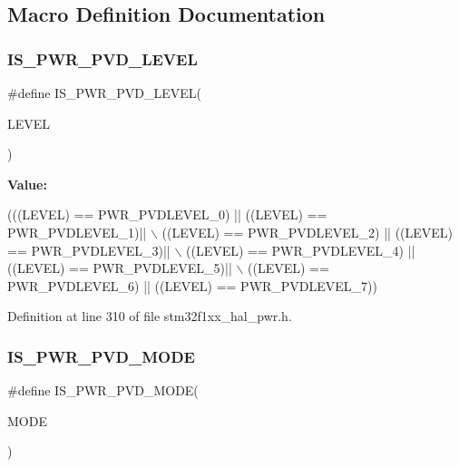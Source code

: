 \subsection{Macro Definition Documentation}
\mbox{\label{group___p_w_r___private___macros_gabac4485a57abc97aad91eaa0b65ae927}} 
\subsubsection{\texorpdfstring{I\+S\+\_\+\+P\+W\+R\+\_\+\+P\+V\+D\+\_\+\+L\+E\+V\+EL}{IS\_PWR\_PVD\_LEVEL}}
{\footnotesize\ttfamily \#define I\+S\+\_\+\+P\+W\+R\+\_\+\+P\+V\+D\+\_\+\+L\+E\+V\+EL(\begin{DoxyParamCaption}\item[{}]{L\+E\+V\+EL }\end{DoxyParamCaption})}

{\bfseries Value\+:}
\begin{DoxyCode}
(((LEVEL) == PWR\_PVDLEVEL\_0) || ((LEVEL) == PWR\_PVDLEVEL\_1)|| \(\backslash\)
                                 ((LEVEL) == PWR\_PVDLEVEL\_2) || ((LEVEL) == PWR\_PVDLEVEL\_3)|| \(\backslash\)
                                 ((LEVEL) == PWR\_PVDLEVEL\_4) || ((LEVEL) == PWR\_PVDLEVEL\_5)|| \(\backslash\)
                                 ((LEVEL) == PWR\_PVDLEVEL\_6) || ((LEVEL) == PWR\_PVDLEVEL\_7))
\end{DoxyCode}


Definition at line 310 of file stm32f1xx\+\_\+hal\+\_\+pwr.\+h.

\mbox{\label{group___p_w_r___private___macros_ga8edfbbba20e58a9281408c23dc6ff7ef}} 
\subsubsection{\texorpdfstring{I\+S\+\_\+\+P\+W\+R\+\_\+\+P\+V\+D\+\_\+\+M\+O\+DE}{IS\_PWR\_PVD\_MODE}}
{\footnotesize\ttfamily \#define I\+S\+\_\+\+P\+W\+R\+\_\+\+P\+V\+D\+\_\+\+M\+O\+DE(\begin{DoxyParamCaption}\item[{}]{M\+O\+DE }\end{DoxyParamCaption})}

